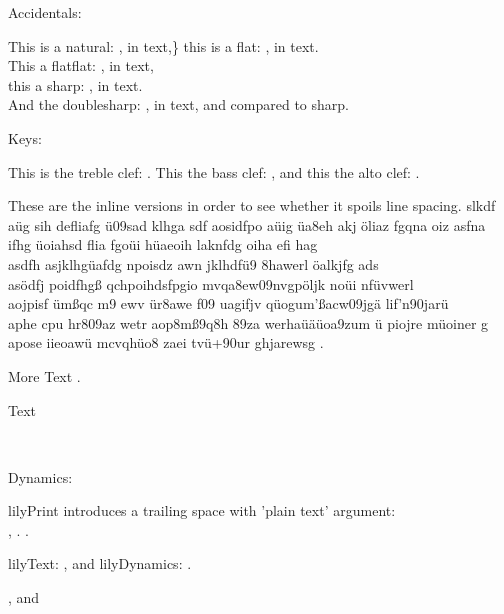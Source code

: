 \documentclass{scrartcl}
\begin{document}
	Accidentals:
	
	This is a natural: \natural, in \natural* text,\}
	this is a flat: \flat, in \flat* text.\\
	This a flatflat: \flatflat, in \flatflat* text,\\
	this a sharp: \sharp, in \sharp* text.\\
	And the doublesharp: \doublesharp, in \doublesharp* text, and \sharp* compared to sharp.
	
	Keys:
	
	This is the treble clef: \clefG . This the bass clef: \clefF, and this the alto clef: \clefC.
	
	These are the inline versions in order to see whether it spoils line spacing. slkdf aüg sih defliafg ü09sad klhga sdf \clefGInline* aosidfpo aüig üa8eh akj öliaz fgqna oiz asfna ifhg üoiahsd flia fgoüi hüaeoih laknfdg oiha efi hag \\
	asdfh asjklhgüafdg npoisdz awn jklhdfü9 8hawerl öalkjfg ads\\
	asödfj \clefFInline poidfhgß \clefFInline* qchpoihdsfpgio mvqa8ew09nvgpöljk noüi nfüvwerl \\
	aojpisf ümßqc m9 ewv ür8awe f09 uagifjv qüogum'ßacw09jgä lif'n90jarü\\
	aphe cpu hr809az wetr \clefCInline* aop8mß9q8h 89za werhaüäüoa9zum ü piojre müoiner g\\
	apose iieoawü mcvqhüo8 zaei tvü+90ur ghjarewsg \clefCInline.
	
	\lilyTimeC*[raise=-0.4] More Text \lilyTimeCHalf.
	
	\clefF* Text
	
	
	

	 ~

	 \lilyDot[scale=1.2]
	
	
	Dynamics: 
	
	
	lilyPrint introduces a trailing space with 'plain text' argument:\\
	, . 
	.
	

	lilyText: , and lilyDynamics: .
	
	\lilyRFZ, \lilyRF* and \lilyRFZ
	


\end{document}
